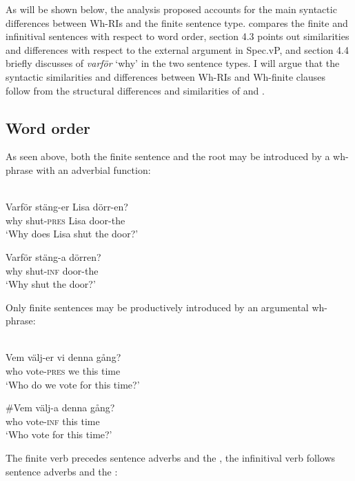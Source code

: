 \documentclass[output=paper]{LSP/langsci}
\begin{document}
As will be shown below, the analysis proposed accounts for the main syntactic differences between Wh-RIs and the finite sentence type.  compares the finite and infinitival sentences with respect to word order, section 4.3 points out similarities and differences with respect to the external argument in Spec.vP, and section 4.4 briefly discusses  of \textit{varför} ‘why’ in the two sentence types. I will argue that the syntactic similarities and differences between Wh-RIs and Wh-finite clauses follow from the structural differences and similarities of  and .

\subsection{Word order}\label{sec:platzack:4.2}

As seen above, both the finite sentence and the root  may be introduced by a wh-phrase with an adverbial function:

\ea%
    \label{ex:platzack:19}
	  \\
   \ea
\gll   Varför  stäng-er  Lisa  dörr-en?        \\
          why    shut-\textsc{pres} Lisa  door-the\\
    \glt   ‘Why does Lisa shut the door?’

   \ex
\gll   Varför  stäng-a  dörren?\\
          why    shut-\textsc{inf}  door-the\\
    \glt   ‘Why shut the door?'
\z
\z

Only finite sentences may be productively introduced by an argumental wh-phrase: 

\ea%
    \label{ex:platzack:20}
	     \\
   \ea
\gll Vem  välj-er    vi    denna gång?\\
        who  vote-\textsc{pres}  we    this  time\\
  \glt   ‘Who do we vote for this time?’

   \ex \label{ex:platzack:20b}
\gll \#Vem    välj-a    denna  gång? \\
         who   vote-\textsc{inf}    this    time\\
  \glt   ‘Who vote for this time?’ \citep[IV: 827]{TelemanEtAl1999}
\z
\z

The finite verb precedes sentence adverbs and the , the infinitival verb follows sentence adverbs and the :
\end{document}
